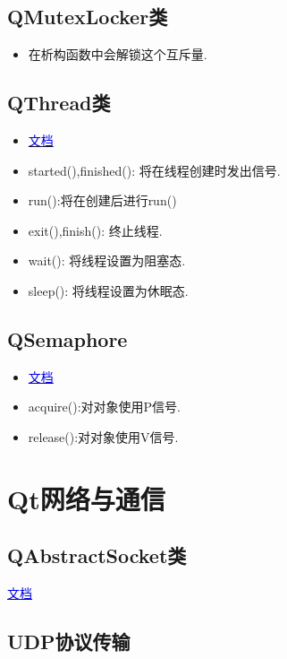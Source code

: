 \documentclass[11pt]{article}
\begin{document}
\subsection{QMutexLocker类}
\begin{itemize}
\item 在析构函数中会解锁这个互斥量.
\end{itemize}

\subsection{QThread类}
\begin{itemize}
\item 
\href{https://doc.qt.io/qt-6/qthread.html#details}{
\textcolor{blue}{文档}}
\item started(),finished(): 将在线程创建时发出信号.
\item run():将在创建后进行run()
\item exit(),finish(): 终止线程.
\item wait(): 将线程设置为阻塞态.
\item sleep(): 将线程设置为休眠态.
\end{itemize}


\subsection{QSemaphore}
\begin{itemize}
\item 
\href{https://doc.qt.io/qt-5/qsemaphore.html#details}{
\textcolor{blue}{文档}}
\item acquire():对对象使用P信号.
\item release():对对象使用V信号.
\end{itemize}


\section{Qt网络与通信}
\subsection{QAbstractSocket类}
\href{https://doc.qt.io/qt-6/qabstractsocket.html}{
\textcolor{blue}{文档}}





\subsection{UDP协议传输}
\end{document}
